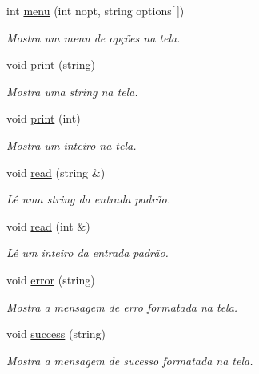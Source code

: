\begin{DoxyCompactItemize}
\item 
int \hyperlink{classTextual_a5ef7e693558fded42c5df499f3989773}{menu} (int nopt, string options\mbox{[}$\,$\mbox{]})
\begin{DoxyCompactList}\small\item\em Mostra um menu de opções na tela. \end{DoxyCompactList}\item 
void \hyperlink{classTextual_a79264d4c405089034447a553cd3859e5}{print} (string)
\begin{DoxyCompactList}\small\item\em Mostra uma string na tela. \end{DoxyCompactList}\item 
void \hyperlink{classTextual_aab79476a2e99375655df0bc3d8738536}{print} (int)
\begin{DoxyCompactList}\small\item\em Mostra um inteiro na tela. \end{DoxyCompactList}\item 
void \hyperlink{classTextual_a5998864514acbf61ca8d6fa1845d0d22}{read} (string \&)
\begin{DoxyCompactList}\small\item\em Lê uma string da entrada padrão. \end{DoxyCompactList}\item 
void \hyperlink{classTextual_a888e02776648906696eeaea0e8691cd6}{read} (int \&)
\begin{DoxyCompactList}\small\item\em Lê um inteiro da entrada padrão. \end{DoxyCompactList}\item 
void \hyperlink{classTextual_a42ebc971370c4de20314ee33cd863cb3}{error} (string)
\begin{DoxyCompactList}\small\item\em Mostra a mensagem de erro formatada na tela. \end{DoxyCompactList}\item 
void \hyperlink{classTextual_ab9edde475ba8687ce2ed448212405e12}{success} (string)
\begin{DoxyCompactList}\small\item\em Mostra a mensagem de sucesso formatada na tela. \end{DoxyCompactList}\end{DoxyCompactItemize}


